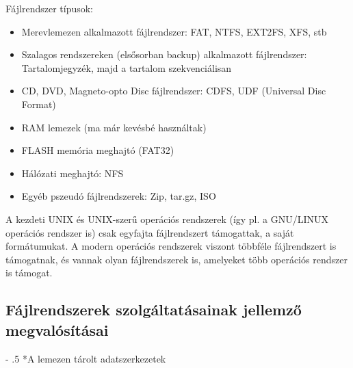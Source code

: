 \documentclass[tikz,12pt,margin=0px]{article}
\makeatletter
\renewcommand\paragraph{%
	\@startsection{paragraph}{4}{0mm}%
	{-\baselineskip}%
	{.5\baselineskip}%
	{\normalfont\normalsize\bfseries}}
\makeatother
\begin{document}
	\noindent Fájlrendszer típusok:
	\begin{itemize}[topsep=8pt,itemsep=4pt,partopsep=4pt, parsep=4pt]
		\item Merevlemezen alkalmazott fájlrendszer: FAT, NTFS, EXT2FS, XFS, stb
		\item Szalagos rendszereken (elsősorban backup) alkalmazott fájlrendszer: Tartalomjegyzék, majd a tartalom szekvenciálisan
		\item CD, DVD, Magneto-opto Disc fájlrendszer: CDFS, UDF (Universal Disc Format)
		\item RAM lemezek (ma már kevésbé használtak)
		\item FLASH memória meghajtó (FAT32)
		\item Hálózati meghajtó: NFS
		\item Egyéb pszeudó fájlrendszerek: Zip, tar.gz, ISO
	\end{itemize}

    \noindent A kezdeti UNIX és UNIX-szerű operációs rendszerek (így pl. a GNU/LINUX operációs rendszer is) csak egyfajta fájlrendszert támogattak, a saját formátumukat. A modern operációs rendszerek viszont többféle fájlrendszert is támogatnak, és vannak olyan fájlrendszerek is, amelyeket több operációs rendszer is támogat.

	\subsection*{Fájlrendszerek szolgáltatásainak jellemző megvalósításai\\}
	
    \paragraph*{A lemezen tárolt adatszerkezetek\\}
\end{document}
